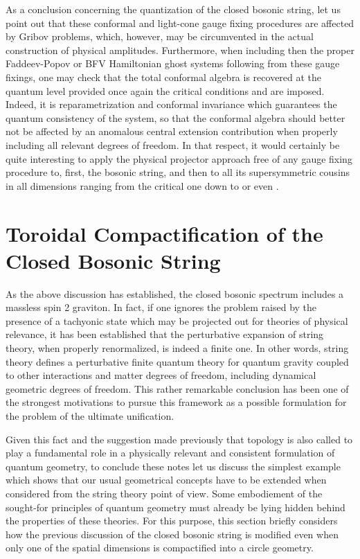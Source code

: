 \documentclass[a4paper,11pt]{article}
\begin{document}
As a conclusion concerning the quantization of the closed bosonic string,
let us point out that these conformal and light-cone gauge fixing
procedures are affected by Gribov problems,\cite{JG10,JG11} which, however, 
may be circumvented in the actual construction of physical amplitudes. 
Furthermore, when including then the proper Faddeev-Popov or BFV Hamiltonian 
ghost systems following from these gauge fixings, one may check that the
total conformal algebra is recovered at the quantum level
provided once again the critical conditions \coordHE{} and \coordHE{} are 
imposed.\cite{Pol,GSW,JG10} Indeed,
it is reparametrization and conformal invariance which guarantees the
quantum consistency of the system, so that the conformal algebra should
better not be affected by an anomalous central extension contribution
when properly including all relevant degrees of freedom. In that respect,
it would certainly be quite interesting to apply the physical projector
approach free of any gauge fixing procedure to, first, the bosonic string,
and then to all its supersymmetric cousins in all dimensions ranging
from the critical \coordHE{} one down to \coordHE{} or even \coordHE{}.


\section{Toroidal Compactification of the Closed Bosonic String}
\label{Sect8}

As the above discussion has established, the closed bosonic spectrum
includes a massless spin 2 graviton. In fact, if one ignores the problem
raised by the presence of a tachyonic state which may be projected out for
theories of physical relevance, it has been established\cite{Pol,GSW} that 
the perturbative expansion of string theory, when properly renormalized, is 
indeed a finite one. In other words, string theory defines a perturbative 
finite quantum theory for quantum gravity coupled to other interactions and 
matter degrees of freedom, including dynamical geometric degrees of freedom. 
This rather remarkable conclusion has been one of the strongest motivations 
to pursue this framework as a possible formulation for the problem of the 
ultimate unification.

Given this fact and the suggestion made previously that topology is also
called to play a fundamental role in a physically relevant and consistent
formulation of quantum geometry, to conclude these notes let us discuss
the simplest example which shows that our usual geometrical concepts have
to be extended when considered from the string theory point of view.
Some em\-bo\-die\-ment of the sought-for principles of quantum geometry must
already be lying hidden behind the properties of these theories.
For this purpose, this section briefly considers how the previous
discussion of the closed bosonic string is modified even when only one
of the spatial dimensions is compactified into a circle geometry.
\end{document}
